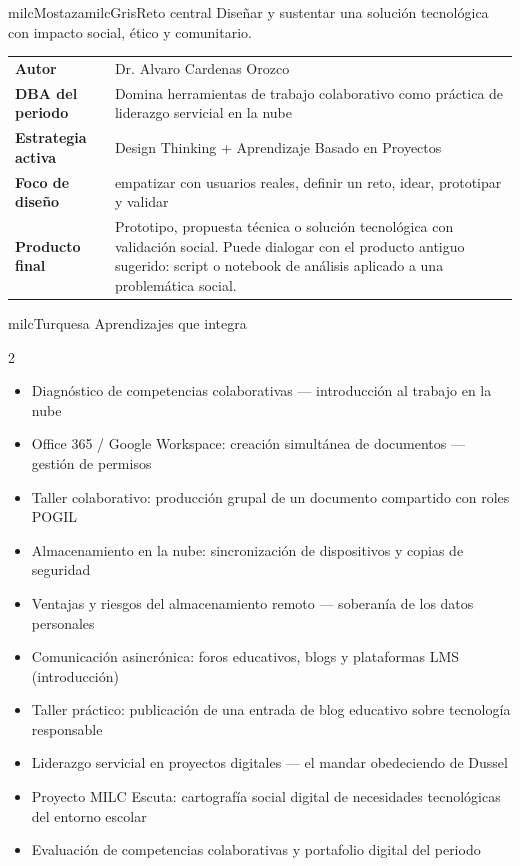 \documentclass[11pt,letterpaper]{article}
\begin{document}
\begin{softbox}{milcMostaza}{milcGris}{Reto central}
Diseñar y sustentar una solución tecnológica con impacto social, ético y comunitario.
\end{softbox}

\begin{tabularx}{\textwidth}{>{\bfseries}p{3.4cm}X}
\rowcolor{milcMagenta!12}Autor & Dr. Alvaro Cardenas Orozco\\
DBA del periodo & Domina herramientas de trabajo colaborativo como práctica de liderazgo servicial en la nube\\
Estrategia activa & Design Thinking + Aprendizaje Basado en Proyectos\\
Foco de diseño & empatizar con usuarios reales, definir un reto, idear, prototipar y validar\\
Producto final & Prototipo, propuesta técnica o solución tecnológica con validación social. Puede dialogar con el producto antiguo sugerido: script o notebook de análisis aplicado a una problemática social.\\
\end{tabularx}

\begin{titlebox}{milcTurquesa}
Aprendizajes que integra
\end{titlebox}
\begin{multicols}{2}
\begin{itemize}[leftmargin=*]
\item Diagnóstico de competencias colaborativas — introducción al trabajo en la nube
\item Office 365 / Google Workspace: creación simultánea de documentos — gestión de permisos
\item Taller colaborativo: producción grupal de un documento compartido con roles POGIL
\item Almacenamiento en la nube: sincronización de dispositivos y copias de seguridad
\item Ventajas y riesgos del almacenamiento remoto — soberanía de los datos personales
\item Comunicación asincrónica: foros educativos, blogs y plataformas LMS (introducción)
\item Taller práctico: publicación de una entrada de blog educativo sobre tecnología responsable
\item Liderazgo servicial en proyectos digitales — el mandar obedeciendo de Dussel
\item Proyecto MILC Escuta: cartografía social digital de necesidades tecnológicas del entorno escolar
\item Evaluación de competencias colaborativas y portafolio digital del periodo
\end{itemize}
\end{multicols}
\end{document}
